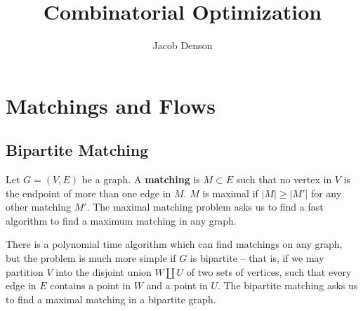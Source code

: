 

\DeclareMathOperator{\Dom}{Dom}
\DeclareMathOperator{\delin}{\delta_{\text{in}}}
\DeclareMathOperator{\delout}{\delta_{\text{out}}}

\def\@fnsymbol#1{\ensuremath{\ifcase#1\or *\or \dagger\or \ddagger\or
   \mathsection\or \mathparagraph\or \|\or **\or \dagger\dagger
   \or \ddagger\ddagger \else\@ctrerr\fi}}
\renewcommand{\thefootnote}{\fnsymbol{footnote}}

\title{Combinatorial Optimization}
\author{Jacob Denson}




\maketitle

\tableofcontents


\chapter{Matchings and Flows}

\section{Bipartite Matching}

Let $G = (V,E)$ be a graph. A {\bf matching} is $M \subset E$ such that no vertex in $V$ is the endpoint of more than one edge in $M$. $M$ is maximal if $|M| \geq |M'|$ for any other matching $M'$. The maximal matching problem asks us to find a fast algorithm to find a maximum matching in any graph.

There is a polynomial time algorithm which can find matchings on any graph, but the problem is much more simple if $G$ is bipartite -- that is, if we may partition $V$ into the disjoint union $W \amalg U$ of two sets of vertices, such that every edge in $E$ contains a point in $W$ and a point in $U$. The bipartite matching asks us to find a maximal matching in a bipartite graph.

